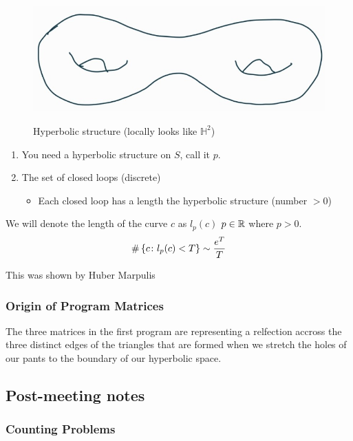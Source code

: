 \documentclass{amsart}
\begin{document}
	\begin{figure}[h]
		\includegraphics[width=0.5\linewidth]{g2_torus}
		\label{fig:g2_torus}
		\caption{Hyperbolic structure (locally looks like $\mathbb{H}^2$)}
	\end{figure}
	
	\begin{enumerate}
		\item You need a hyperbolic structure on $S$, call it  $p$.
		\item The set of closed loops (discrete)
		\begin{itemize}
			\item Each closed loop has a length \wrt the hyperbolic structure (number $> 0$)
		\end{itemize}
	\end{enumerate}
	
	We will denote the length of the curve $c$ as $l_p(c)$ \wrt $p \in \mathbb{R}$ where $p > 0$.
	\begin{equation*}
		\# \left\{c \colon l_p(c) < T\right\} \sim \frac{e^T}{T}
	\end{equation*}
	\begin{remark}
		This was shown by Huber Marpulis 
	\end{remark}
	
	\subsubsection*{Origin of Program Matrices}
	
	The three matrices in the first program are representing a relfection accross the three distinct edges of the triangles that are formed when we stretch the holes of our pants to the boundary of our hyperbolic space. 
	
	
\subsection{Post-meeting notes}

\subsubsection{Counting Problems}
\end{document}
